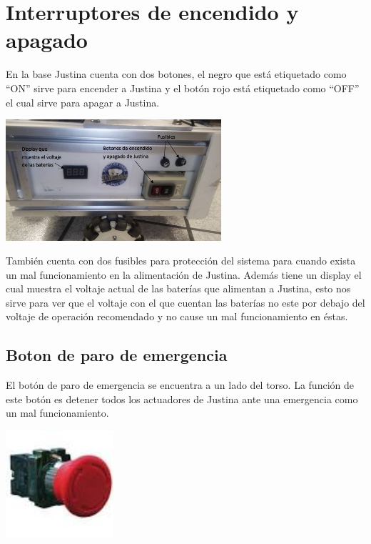 \documentclass[user_manual.tex]{subfiles}
\begin{document}
\section{Interruptores de encendido y apagado}

En la base Justina cuenta con dos botones, el negro que está etiquetado como ``ON'' sirve para encender a Justina y el botón
rojo está etiquetado como ``OFF'' el cual sirve para apagar a Justina.\\

\begin{center}
\includegraphics[width=0.6\textwidth]{Figures/Hardware/Diagramas/Encendido.png}
\label{fig:Hardware:Diagramas:Justina:Encendido}
\end{center}

También cuenta con dos fusibles para protección del sistema para cuando exista un mal funcionamiento en la alimentación de 
Justina. Además tiene un display el cual muestra el voltaje actual de las baterías que alimentan a Justina, esto nos sirve
para ver que el voltaje con el que cuentan las baterías no este por debajo del voltaje de operación recomendado y no cause
un mal funcionamiento en éstas.

\subsection{Boton de paro de emergencia}
El botón de paro de emergencia se encuentra a un lado del torso. La función de este botón es 
detener todos los actuadores de Justina ante una emergencia como un mal funcionamiento.
\begin{center}
\includegraphics[width=0.3\textwidth]{Figures/Hardware/Partes/RBES.jpg}
\label{fig:Hardware:Partes:Paro:Boton}
\end{center}
\end{document}
